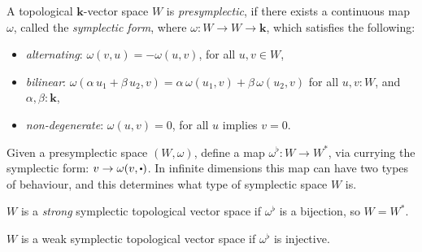         
        
        
        \begin{defn}
          \label{defn:symplectic}
          A topological \(\mathbf{k}\)-vector space 
          \(W\) is \emph{presymplectic}, if there exists a continuous map \(\omega\), called the \emph{symplectic form}, where \(\omega : W \rightarrow W \rightarrow  \mathbf{k}  \), which satisfies the following:
          \begin{itemize}
            \item \emph{alternating}: \( \omega(v,u) = -\omega(u,v)\), for all \( u,v \in W\),
            \item \emph{bilinear}: \( \omega(\alpha \, u_1 + \beta \,  u_2 ,v) = \alpha \, \omega(u_1 ,v) + \beta \, \omega(u_2,v) \) for all \( u,v : W\), and \( \alpha, \beta :  \mathbf{k} \),
            \item \emph{non-degenerate}: \( \omega(u,v) = 0\), for all \(u\) implies \(v = 0\).
          \end{itemize}
        \end{defn}
        
        Given a presymplectic space \((W,\omega)\), define a map \(\omega^{\flat} : W \rightarrow W^*\), via currying the symplectic form: \( v \rightarrow \omega(v,\sbt )\). In infinite dimensions this map can have two types of behaviour, and this determines what type of symplectic space \(W\) is.
        
        \begin{defn}
        \label{defn:strongsympl}
        \(W\) is a \emph{strong} symplectic topological vector space if \( \omega^{\flat}\) is a bijection, so \(W = W^*\).  
        \end{defn}
        
        \begin{defn}
        \label{defn:weaksympl}
        \(W\) is a weak symplectic topological vector space if \(\omega^{\flat}\) is injective.  
        \end{defn}
        
